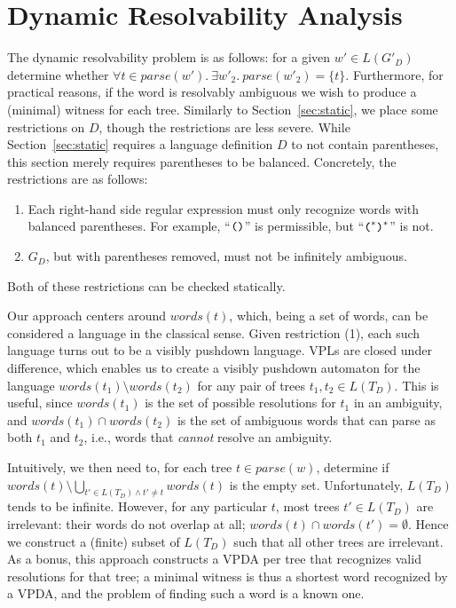 \documentclass[acmsmall,review,anonymous]{acmart}\settopmatter{printfolios=true,printccs=false,printacmref=false}
\newcommand{\parse}{\mathit{parse}} %
\newcommand{\words}{\mathit{words}} %
\begin{document}
\section{Dynamic Resolvability Analysis} \label{sec:dynamic}

The dynamic resolvability problem is as follows: for a given $w' \in L(G'_D)$ determine whether $\forall t \in \parse(w').\ \exists w'_2.\ \parse(w'_2) = \{t\}$. Furthermore, for practical reasons, if the word is resolvably ambiguous we wish to produce a (minimal) witness for each tree. Similarly to Section~\ref{sec:static}, we place some restrictions on $D$, though the restrictions are less severe. While Section~\ref{sec:static} requires a language definition $D$ to not contain parentheses, this section merely requires parentheses to be balanced. Concretely, the restrictions are as follows:

\begin{enumerate}
\item Each right-hand side regular expression must only recognize words with balanced parentheses. For example, ``$\verb|(| \verb|)|$'' is permissible, but ``$\verb|(|^{*} \verb|)|^{*}$'' is not.
\item $G_D$, but with parentheses removed, must not be infinitely ambiguous.
\end{enumerate}

\noindent Both of these restrictions can be checked statically.

Our approach centers around $\words(t)$, which, being a set of words, can be considered a language in the classical sense. Given restriction (1), each such language turns out to be a visibly pushdown language. VPLs are closed under difference, which enables us to create a visibly pushdown automaton for the language $\words(t_1) \setminus \words(t_2)$ for any pair of trees $t_1, t_2 \in L(T_D)$. This is useful, since $\words(t_1)$ is the set of possible resolutions for $t_1$ in an ambiguity, and $\words(t_1) \cap \words(t_2)$ is the set of ambiguous words that can parse as both $t_1$ and $t_2$, i.e., words that \emph{cannot} resolve an ambiguity.

Intuitively, we then need to, for each tree $t \in \parse(w)$, determine if $\words(t) \setminus \bigcup_{t' \in L(T_D) \land t' \neq t} \words(t)$ is the empty set. Unfortunately, $L(T_D)$ tends to be infinite. However, for any particular $t$, most trees $t' \in L(T_D)$ are irrelevant: their words do not overlap at all; $\words(t) \cap \words(t') = \emptyset$. Hence we construct a (finite) subset of $L(T_D)$ such that all other trees are irrelevant. As a bonus, this approach constructs a VPDA per tree that recognizes valid resolutions for that tree; a minimal witness is thus a shortest word recognized by a VPDA, and the problem of finding such a word is a known one.
\end{document}

